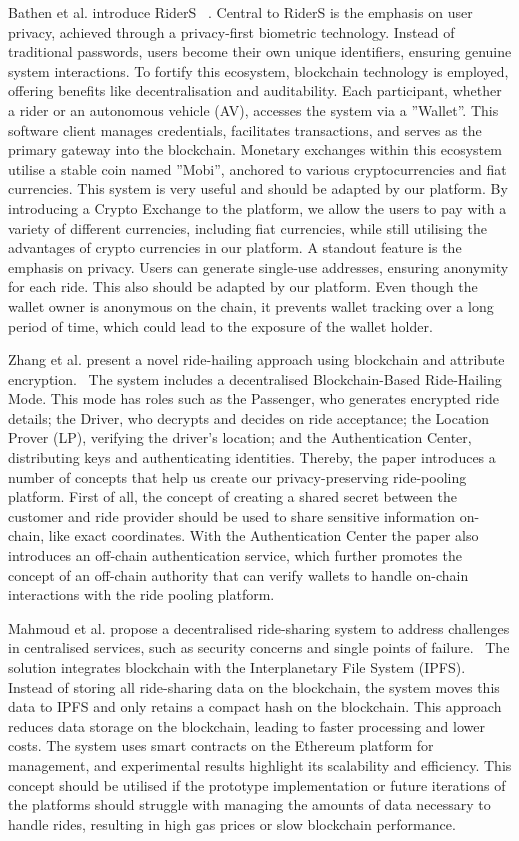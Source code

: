 Bathen et al. introduce RiderS ~\cite{Bathen.}. Central to RiderS is the emphasis on user privacy, achieved through a privacy-first biometric technology. Instead of traditional passwords, users become their own unique identifiers, ensuring genuine system interactions. To fortify this ecosystem, blockchain technology is employed, offering benefits like decentralisation and auditability. Each participant, whether a rider or an autonomous vehicle (AV), accesses the system via a ''Wallet''. This software client manages credentials, facilitates transactions, and serves as the primary gateway into the blockchain. Monetary exchanges within this ecosystem utilise a stable coin named ''Mobi'', anchored to various cryptocurrencies and fiat currencies. This system is very useful and should be adapted by our platform. By introducing a Crypto Exchange to the platform, we allow the users to pay with a variety of different currencies, including fiat currencies, while still utilising the advantages of crypto currencies   in our platform. A standout feature is the emphasis on privacy. Users can generate single-use addresses, ensuring anonymity for each ride. This also should be adapted by our platform. Even though the wallet owner is anonymous on the chain, it prevents wallet tracking over a long period of time, which could lead to the exposure of the wallet holder.

Zhang et al. present a novel ride-hailing approach using blockchain and attribute encryption.~\cite{Zhang.} The system includes a decentralised Blockchain-Based Ride-Hailing Mode. This mode has roles such as the Passenger, who generates encrypted ride details; the Driver, who decrypts and decides on ride acceptance; the Location Prover (LP), verifying the driver's location; and the Authentication Center, distributing keys and authenticating identities. Thereby, the paper introduces a number of concepts that help us create our privacy-preserving ride-pooling platform. First of all, the concept of creating a shared secret between the customer and ride provider should be used  to share sensitive information on-chain, like exact coordinates. With the  Authentication Center the paper also introduces an off-chain authentication service, which further promotes the concept of an off-chain authority that can verify  wallets to handle on-chain interactions with the ride pooling platform.

Mahmoud et al.  propose a decentralised ride-sharing system to address challenges in centralised services, such as security concerns and single points of failure.~\cite{Mahmoud.2022}  The solution integrates blockchain with the Interplanetary File System (IPFS). Instead of storing all ride-sharing data on the blockchain, the system moves this data to IPFS and only retains a compact hash on the blockchain. This approach reduces data storage on the blockchain, leading to faster processing and lower costs. The system uses smart contracts on the Ethereum platform for management, and experimental results highlight its scalability and efficiency. This concept should be utilised if the prototype implementation or future iterations of the platforms should struggle with managing the amounts of data necessary to handle rides, resulting in high gas prices or slow blockchain performance.


